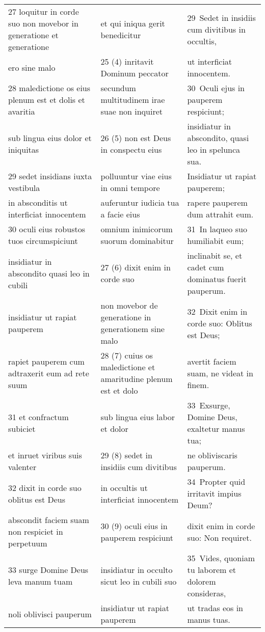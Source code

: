 \documentclass{article}
\begin{document}
\begin{longtable}{@{}p{}p{}p{}@{}}
27 loquitur in corde suo non movebor in generatione et generatione	&	et qui iniqua gerit benedicitur	&	29 Sedet in insidiis cum divitibus in occultis,	\\
ero sine malo	&	25 (4) inritavit Dominum peccator	&	ut interficiat innocentem.	\\
28 maledictione os eius plenum est et dolis et avaritia	&	secundum multitudinem irae suae non inquiret	&	30 Oculi ejus in pauperem respiciunt;	\\
sub lingua eius dolor et iniquitas	&	26 (5) non est Deus in conspectu eius	&	insidiatur in abscondito, quasi leo in spelunca sua.	\\
29 sedet insidians iuxta vestibula	&	polluuntur viae eius in omni tempore	&	Insidiatur ut rapiat pauperem;	\\
in absconditis ut interficiat innocentem	&	auferuntur iudicia tua a facie eius	&	rapere pauperem dum attrahit eum.	\\
30 oculi eius robustos tuos circumspiciunt	&	omnium inimicorum suorum dominabitur	&	31 In laqueo suo humiliabit eum;	\\
insidiatur in abscondito quasi leo in cubili	&	27 (6) dixit enim in corde suo	&	inclinabit se, et cadet cum dominatus fuerit pauperum.	\\
insidiatur ut rapiat pauperem	&	non movebor de generatione in generationem sine malo	&	32 Dixit enim in corde suo: Oblitus est Deus;	\\
rapiet pauperem cum adtraxerit eum ad rete suum	&	28 (7) cuius os maledictione et amaritudine plenum est et dolo	&	avertit faciem suam, ne videat in finem.	\\
31 et confractum subiciet	&	sub lingua eius labor et dolor	&	33 Exsurge, Domine Deus, exaltetur manus tua;	\\
et inruet viribus suis valenter	&	29 (8) sedet in insidiis cum divitibus	&	ne obliviscaris pauperum.	\\
32 dixit in corde suo oblitus est Deus	&	in occultis ut interficiat innocentem	&	34 Propter quid irritavit impius Deum?	\\
abscondit faciem suam non respiciet in perpetuum	&	30 (9) oculi eius in pauperem respiciunt	&	dixit enim in corde suo: Non requiret.	\\
33 surge Domine Deus leva manum tuam	&	insidiatur in occulto sicut leo in cubili suo	&	35 Vides, quoniam tu laborem et dolorem consideras,	\\
noli oblivisci pauperum	&	insidiatur ut rapiat pauperem	&	ut tradas eos in manus tuas.	\\

\end{longtable}
\end{document}
